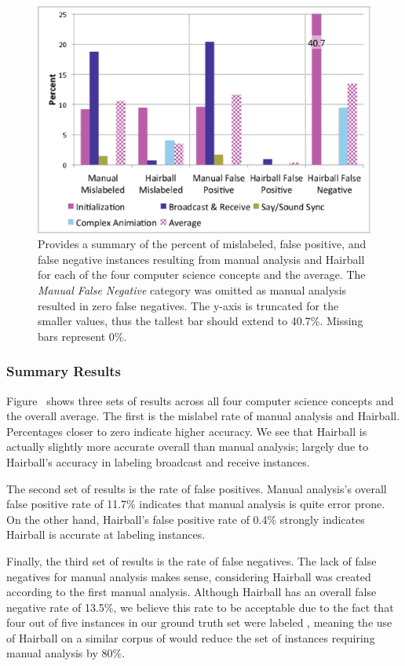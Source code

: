 \begin{figure}[!t]
\centering \includegraphics[trim=.3in .15in .2in .15in, clip,
  width=5.25in]{graphs/AutoSummary.eps}
\caption{Provides a summary of the percent of mislabeled, false positive, and
  false negative instances resulting from manual analysis and Hairball for each
  of the four computer science concepts and the average. The \emph{Manual False
    Negative} category was omitted as manual analysis resulted in zero false
  negatives. The y-axis is truncated for the smaller values, thus the tallest
  bar should extend to 40.7\%. Missing bars represent 0\%.}
\end{figure}

\subsubsection{Summary Results}
Figure~ shows three sets of results across all four
computer science concepts and the overall average. The first is the mislabel
rate of manual analysis and Hairball. Percentages closer to zero indicate
higher accuracy. We see that Hairball is actually slightly more accurate
overall than manual analysis; largely due to Hairball's accuracy in labeling
broadcast and receive instances.

The second set of results is the rate of false positives. Manual analysis's
overall false positive rate of 11.7\% indicates that manual analysis is quite
error prone. On the other hand, Hairball's false positive rate of 0.4\%
strongly indicates Hairball is accurate at labeling \correct{} instances.

Finally, the third set of results is the rate of false negatives. The lack of
false negatives for manual analysis makes sense, considering Hairball was
created according to the first manual analysis. Although Hairball has an
overall false negative rate of 13.5\%, we believe this rate to be acceptable
due to the fact that four out of five instances in our ground truth set were
labeled \correct{}, meaning the use of Hairball on a similar corpus of
 would reduce the set of instances requiring manual analysis by
80\%.
